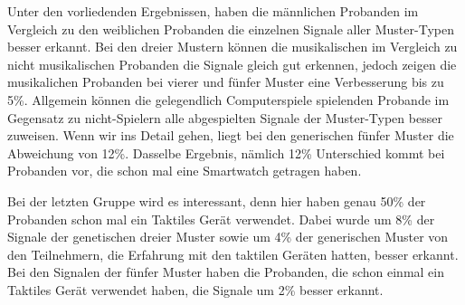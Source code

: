 Unter den vorliedenden Ergebnissen, haben die m{\"a}nnlichen Probanden im Vergleich zu den weiblichen Probanden die einzelnen Signale aller Muster-Typen besser erkannt.
Bei den dreier Mustern k{\"o}nnen die musikalischen im Vergleich zu nicht musikalischen Probanden die Signale gleich gut erkennen, jedoch zeigen die musikalichen Probanden bei vierer und f{\"u}nfer Muster eine Verbesserung bis zu 5\%.
Allgemein k{\"o}nnen die gelegendlich Computerspiele spielenden Probande im Gegensatz zu nicht-Spielern alle abgespielten Signale der Muster-Typen besser zuweisen. Wenn wir ins Detail gehen, liegt bei den generischen f{\"u}nfer Muster die Abweichung von 12\%.
Dasselbe Ergebnis, n{\"a}mlich 12\% Unterschied kommt bei Probanden vor, die schon mal eine Smartwatch getragen haben.

Bei der letzten Gruppe wird es interessant, denn hier haben genau 50\% der Probanden schon mal ein Taktiles Ger{\"a}t verwendet. 
Dabei wurde um 8\% der Signale der genetischen dreier Muster sowie um 4\% der generischen Muster von den Teilnehmern, die Erfahrung mit den taktilen Ger{\"a}ten hatten, besser erkannt.
Bei den Signalen der f{\"u}nfer Muster haben die Probanden, die schon einmal ein Taktiles Ger{\"a}t verwendet haben, die Signale um 2\% besser erkannt.

